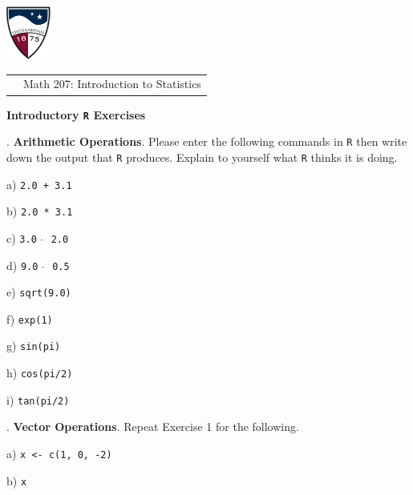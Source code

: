 \documentclass[10pt]{article}
\newcounter{EX}\setcounter{EX}{1}
\newcommand{\EXERCISE}{\arabic{EX}.\stepcounter{EX} }
\begin{document}
\pagestyle{empty}
\lstset{language=R, showspaces=false, showstringspaces=false}

\href{http://www.su.edu}{\includegraphics[height=1.75cm]{sulogo.eps}}
\vspace{-1.69cm}

{\small \hfill
\begin{tabular}{cl}
& Math 207: Introduction to Statistics\\
\end{tabular}
}
\setlength{\baselineskip}{1.05\baselineskip}

\begin{center}
\textbf{\large  Introductory \texttt{R} Exercises}
\end{center}
\medskip

\newcommand{\SUBX}{\smallskip\hspace{10pt}}
\newcommand{\BSK}{\vspace{.14in}}

\EXERCISE \textbf{Arithmetic Operations}.
Please enter the following commands in \texttt{R} then write down the output
that \texttt{R} produces. Explain to yourself what \texttt{R} thinks it
is doing.

\SUBX a) \texttt{2.0 + 3.1}
\BSK

\SUBX b) \texttt{2.0 * 3.1}
\BSK

\SUBX c) \texttt{3.0 $\widehat{\hspace{3pt}}$ 2.0}
\BSK

\SUBX d) \texttt{9.0  $\widehat{\hspace{3pt}}$  0.5}
\BSK

\SUBX e) \texttt{sqrt(9.0)}
\BSK

\SUBX f) \texttt{exp(1)}
\BSK

\SUBX g) \texttt{sin(pi)}
\BSK

\SUBX h) \texttt{cos(pi/2)}
\BSK

\SUBX i) \texttt{tan(pi/2)}
\BSK

\EXERCISE \textbf{Vector Operations}.  Repeat Exercise 1 for the following.
\vspace{-5pt}

\SUBX a) \texttt{x <- c(1, 0, -2)}
\BSK

\SUBX b) \texttt{x}
\BSK
\end{document}
